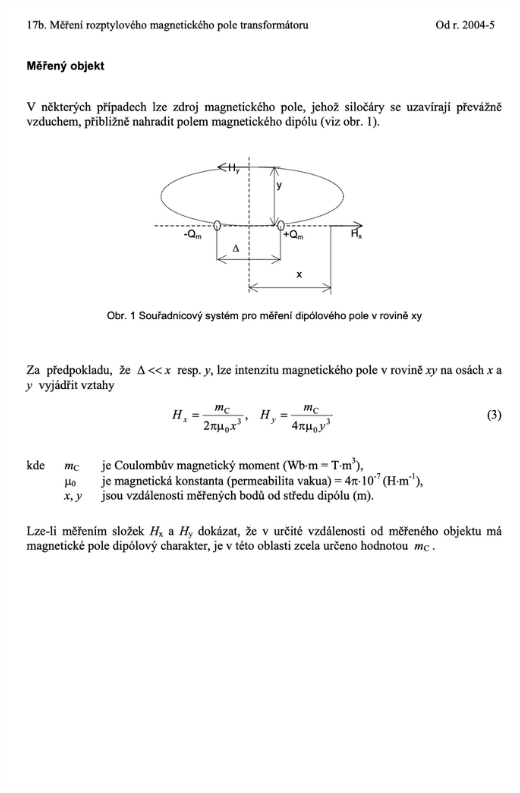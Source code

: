 \documentclass[a4paper,12pt]{article}   %
\begin{document}
\includegraphics[width=\textwidth]{3.png}
\newpage
\end{document}
